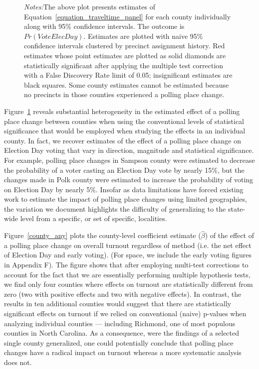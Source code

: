 \documentclass{cup_PSRM}
\begin{document}
\begin{figure}[t!]
\begin{center}
		\label{county_elec}
		\end{center}
	\scriptsize{\emph{Notes:}The above plot presents estimates of Equation~\ref{equation_traveltime_panel} for each county individually along with 95\% confidence intervals.  The outcome is $Pr(VoteElecDay)$.  Estimates are plotted with naive 95\% confidence intervals clustered by precinct assignment history. Red estimates whose point estimates are plotted as solid diamonds are statistically significant after applying the \citet{Benjamini:2006gd} multiple test correction with a False Discovery Rate limit of 0.05; insignificant estimates are black squares.  Some county estimates cannot be estimated because no precincts in those counties experienced a polling place change. }
\end{figure} \normalsize

Figure~\ref{county_elec} reveals substantial heterogeneity in the estimated effect of a polling place change between counties when using the conventional levels of statistical significance that would be employed when studying the effects in an individual county. In fact, we recover estimates of the effect of a polling place change on Election Day voting that vary in direction, magnitude and statistical significance.  For example, polling place changes in Sampson county were estimated to decrease the probability of a voter casting an Election Day vote by nearly 15\%, but the changes made in Polk county were estimated to increase the probability of voting on Election Day by nearly 5\%.  Insofar as data limitations have forced existing work to estimate the impact of polling place changes using limited geographies, the variation we document highlights the difficulty of generalizing to the state-wide level from a specific, or set of specific, localities.

Figure~\ref{county_any} plots the county-level coefficient estimate ($\hat{\beta}$) of the effect of a polling place change on overall turnout regardless of method (i.e. the net effect of Election Day and early voting).  (For space, we include the early voting figures in Appendix F).  The figure shows that after employing multi-test corrections to account for the fact that we are essentially performing multiple hypothesis tests, we find only four counties where effects on turnout are statistically different from zero (two with positive effects and two with negative effects). In contrast, the results in ten additional counties would suggest that there are statistically significant effects on turnout if we relied on conventional (naive) p-values when analyzing individual counties --- including Richmond, one of most populous counties in North Carolina. As a consequence, were the findings of a selected single county generalized, one could potentially conclude that polling place changes have a radical impact on turnout whereas a more systematic analysis does not.
\end{document}

